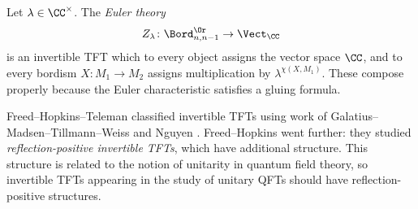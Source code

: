 \begin{example}
Let $\lambda\in\CC^\times$. The \emph{Euler theory}
\begin{equation*}
	Z_\lambda\colon\Bord_{n, n-1}^{\Or}\to\Vect_\CC
\end{equation*}
is an invertible TFT which to every object assigns the vector space $\CC$, and to every bordism $X\colon M_1\to M_2$ assigns
multiplication by $\lambda^{\chi(X, M_1)}$. These compose properly because the Euler characteristic satisfies a
gluing formula.
\end{example}
Freed--Hopkins--Teleman \cite{FHT10} classified invertible TFTs using work of
Galatius--Madsen--Tillmann--Weiss \cite{GMTW09} and Nguyen \cite{Ngu17}. Freed--Hopkins \cite{FH21} went further:
they studied \textit{reflection-positive invertible TFTs}, which have additional structure. This structure is
related to the notion of unitarity in quantum field theory, so invertible TFTs appearing in the study of unitary
QFTs should have reflection-positive structures.

